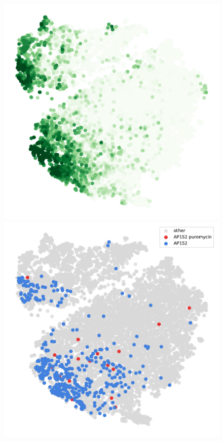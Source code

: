 \begin{figure}[h]
	\endminipage\hfill
		\includegraphics[width=\linewidth]{figures/appendix/tsne_probability_nocolorbar_perinuclear}
		\vfill
		\includegraphics[width=\linewidth]{figures/appendix/tsne_perinuclear_AP1S2}

\end{figure}
